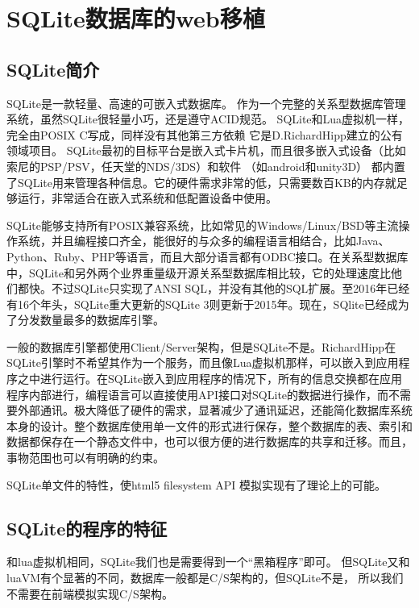 \chapter{SQLite数据库的web移植}

\section{SQLite简介}

SQLite是一款轻量、高速的可嵌入式数据库。
作为一个完整的关系型数据库管理系统，虽然SQLite很轻量小巧，还是遵守ACID规范。
SQLite和Lua虚拟机一样，完全由POSIX C写成，同样没有其他第三方依赖
它是D.RichardHipp建立的公有领域项目。
SQLite最初的目标平台是嵌入式卡片机，而且很多嵌入式设备（比如索尼的PSP/PSV，任天堂的NDS/3DS）和软件 （如android和unity3D） 都内置了SQLite用来管理各种信息。它的硬件需求非常的低，只需要数百KB的内存就足够运行，非常适合在嵌入式系统和低配置设备中使用。

SQLite能够支持所有POSIX兼容系统，比如常见的Windows/Linux/BSD等主流操作系统，并且编程接口齐全，能很好的与众多的编程语言相结合，比如Java、Python、Ruby、PHP等语言，而且大部分语言都有ODBC接口。在关系型数据库中，SQLite和另外两个业界重量级开源关系型数据库相比较，它的处理速度比他们都快。不过SQLite只实现了ANSI SQL，并没有其他的SQL扩展。至2016年已经有16个年头，SQLite重大更新的SQLite 3则更新于2015年。现在，SQlite已经成为了分发数量最多的数据库引擎。

一般的数据库引擎都使用Client/Server架构，但是SQLite不是。RichardHipp在SQLite引擎时不希望其作为一个服务，而且像Lua虚拟机那样，可以嵌入到应用程序之中进行运行。在SQLite嵌入到应用程序的情况下，所有的信息交换都在应用程序内部进行，编程语言可以直接使用API接口对SQLite的数据进行操作，而不需要外部通讯。极大降低了硬件的需求，显著减少了通讯延迟，还能简化数据库系统本身的设计。整个数据库使用单一文件的形式进行保存，整个数据库的表、索引和数据都保存在一个静态文件中，也可以很方便的进行数据库的共享和迁移。而且，事物范围也可以有明确的约束。

SQLite单文件的特性，使html5 filesystem API
模拟实现有了理论上的可能。

\section{SQLite的程序的特征}

和lua虚拟机相同，SQLite我们也是需要得到一个“黑箱程序”即可。
但SQLite又和luaVM有个显著的不同，数据库一般都是C/S架构的，但SQLite不是，
所以我们不需要在前端模拟实现C/S架构。

